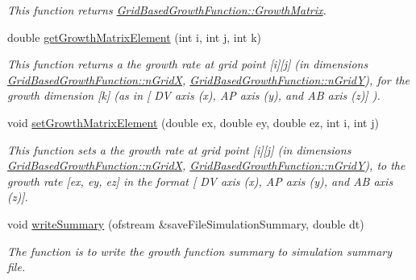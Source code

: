 \begin{DoxyCompactItemize}
\begin{DoxyCompactList}\small\item\em This function returns \hyperlink{classGridBasedGrowthFunction_a5522d9b84fa95ebd65cdf290a4f0a65c}{Grid\+Based\+Growth\+Function\+::\+Growth\+Matrix}. \end{DoxyCompactList}\item 
\hypertarget{classGridBasedGrowthFunction_a1775fe1788bc97569c892d01cc625ea8}{}double \hyperlink{classGridBasedGrowthFunction_a1775fe1788bc97569c892d01cc625ea8}{get\+Growth\+Matrix\+Element} (int i, int j, int k)\label{classGridBasedGrowthFunction_a1775fe1788bc97569c892d01cc625ea8}

\begin{DoxyCompactList}\small\item\em This function returns a the growth rate at grid point \mbox{[}i\mbox{]}\mbox{[}j\mbox{]} (in dimensions \hyperlink{classGridBasedGrowthFunction_af872b9963f3a579dcd615c23bcb58a86}{Grid\+Based\+Growth\+Function\+::n\+Grid\+X}, \hyperlink{classGridBasedGrowthFunction_a625bc963a1f1e7d1f1a35dbd0ef51728}{Grid\+Based\+Growth\+Function\+::n\+Grid\+Y}), for the growth dimension \mbox{[}k\mbox{]} (as in \mbox{[} D\+V axis (x), A\+P axis (y), and A\+B axis (z)\mbox{]} ). \end{DoxyCompactList}\item 
\hypertarget{classGridBasedGrowthFunction_a9d01fcbba5732aad966659d4f64c145b}{}void \hyperlink{classGridBasedGrowthFunction_a9d01fcbba5732aad966659d4f64c145b}{set\+Growth\+Matrix\+Element} (double ex, double ey, double ez, int i, int j)\label{classGridBasedGrowthFunction_a9d01fcbba5732aad966659d4f64c145b}

\begin{DoxyCompactList}\small\item\em This function sets a the growth rate at grid point \mbox{[}i\mbox{]}\mbox{[}j\mbox{]} (in dimensions \hyperlink{classGridBasedGrowthFunction_af872b9963f3a579dcd615c23bcb58a86}{Grid\+Based\+Growth\+Function\+::n\+Grid\+X}, \hyperlink{classGridBasedGrowthFunction_a625bc963a1f1e7d1f1a35dbd0ef51728}{Grid\+Based\+Growth\+Function\+::n\+Grid\+Y}), to the growth rate \mbox{[}ex, ey, ez\mbox{]} in the format \mbox{[} D\+V axis (x), A\+P axis (y), and A\+B axis (z)\mbox{]}. \end{DoxyCompactList}\item 
void \hyperlink{classGridBasedGrowthFunction_a659418841b4a3bc8be1dec15f95d7b76}{write\+Summary} (ofstream \&save\+File\+Simulation\+Summary, double dt)
\begin{DoxyCompactList}\small\item\em The function is to write the growth function summary to simulation summary file. \end{DoxyCompactList}\end{DoxyCompactItemize}
